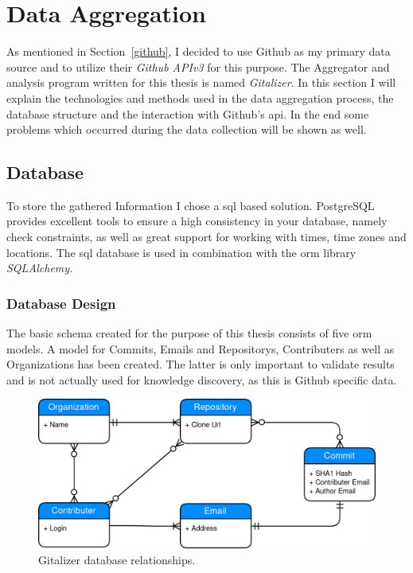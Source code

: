 \section{Data Aggregation}\label{aggregator}
As mentioned in Section~\ref{github}, I decided to use Github as my primary data source and to utilize their \emph{Github APIv3} for this purpose.
The Aggregator and analysis program written for this thesis is named \emph{Gitalizer}.
In this section I will explain the technologies and methods used in the data aggregation process, the database structure and the interaction with Github's \ac{api}.
In the end some problems which occurred during the data collection will be shown as well.


\subsection{Database}\label{data-structure}
To store the gathered Information I chose a \ac{sql} based solution.
PostgreSQL provides excellent tools to ensure a high consistency in your database, namely check constraints, as well as great support for working with times, time zones and locations.
The \ac{sql} database is used in combination with the \ac{orm} library \emph{SQLAlchemy}.


\subsubsection{Database Design}\label{database-design}
The basic schema created for the purpose of this thesis consists of five \ac{orm} models.
A model for Commits, Emails and Repositorys, Contributers as well as Organizations has been created.
The latter is only important to validate results and is not actually used for knowledge discovery, as this is Github specific data.

\begin{figure}[H]
\includegraphics[scale=0.3]{./graphs/gitalizer-data-structure}
\centering
\caption{Gitalizer database relationships.}\label{fig:gitalizer-relationship}
\end{figure}

